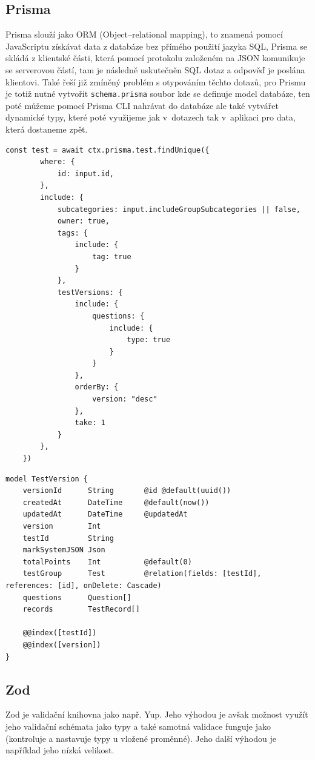 \documentclass[12pt, a4paper,
openright
]{report}
\begin{document}
\subsection{Prisma}
Prisma slouží jako ORM (Object–relational mapping), to znamená pomocí JavaScriptu získávat data z databáze bez přímého použití jazyka SQL, Prisma se skládá z klientské části, která pomocí protokolu založeném na JSON komunikuje se serverovou částí, tam je následně uskutečněn SQL dotaz a odpověď je poslána klientovi. Také řeší již zmíněný problém s otypováním těchto dotazů, pro Prismu je totiž nutné vytvořit \texttt{schema.prisma} soubor kde se definuje model databáze, ten poté můžeme pomocí Prisma CLI nahrávat do databáze ale také vytvářet dynamické typy, které poté využijeme jak v~dotazech tak v~aplikaci pro data, která dostaneme zpět.
\begin{lstlisting}[style=ES6, caption=Získání testu podle id a přidání dat ze spojených tabulek, label=prisma_code_use]
	const test = await ctx.prisma.test.findUnique({
		where: {
			id: input.id,
		},
		include: {
			subcategories: input.includeGroupSubcategories || false,
			owner: true,
			tags: {
				include: {
					tag: true
				}
			},
			testVersions: {
				include: {
					questions: {
						include: {
							type: true
						}
					}
				},
				orderBy: {
					version: "desc"
				},
				take: 1
			}
		},
	})
\end{lstlisting}

\clearpage
\begin{lstlisting}[style=ES6, caption=Schéma modelu verze testu, label=prisma_code_schema]
model TestVersion {
	versionId      String       @id @default(uuid())
	createdAt      DateTime     @default(now())
	updatedAt      DateTime     @updatedAt
	version        Int
	testId         String
	markSystemJSON Json
	totalPoints    Int          @default(0)
	testGroup      Test         @relation(fields: [testId], references: [id], onDelete: Cascade)
	questions      Question[]
	records        TestRecord[]
	
	@@index([testId])
	@@index([version])
}
\end{lstlisting}

\subsection{Zod}
Zod je validační knihovna jako např. Yup. Jeho výhodou je avšak možnost využít jeho validační schémata jako typy a také samotná validace funguje jako  (kontroluje a nastavuje typy u vložené proměnné). Jeho další výhodou je například jeho nízká velikost.
\end{document}
